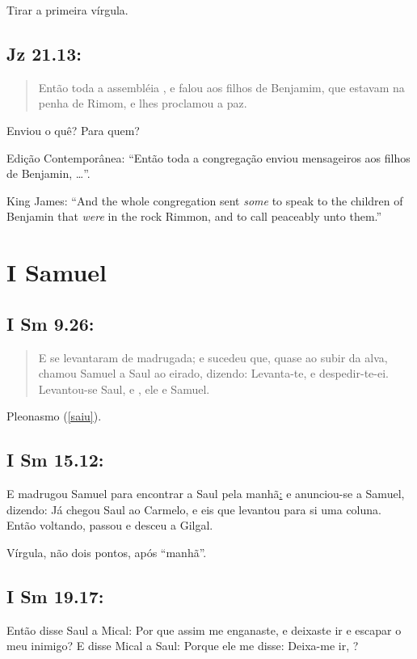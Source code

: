 Tirar a primeira vírgula.

\subsection{Jz 21.13:}
\begin{quote}
    \small
    Então toda a assembléia , e falou aos filhos de Benjamim, que estavam na penha de Rimom, e lhes proclamou a paz.
\end{quote}

Enviou o quê? Para quem?

Edição Contemporânea: ``Então toda a congregação enviou mensageiros aos filhos de Benjamin, \ldots''.

King James: ``And the whole congregation sent \emph{some} to speak to the
children of Benjamin that \emph{were} in the rock Rimmon, and to call
peaceably unto them.''

\section{I Samuel}
\subsection{I Sm 9.26:}
\begin{quote}
    \small
    E se levantaram de madrugada; e sucedeu que, quase ao subir da alva, chamou Samuel a Saul ao eirado, dizendo: Levanta-te, e despedir-te-ei. Levantou-se Saul, e , ele e Samuel.
\end{quote}

Pleonasmo (\ref{saiu}).

\subsection{I Sm 15.12:} E madrugou Samuel para encontrar a Saul pela manhã\uline{:} e anunciou-se a Samuel, dizendo: Já chegou Saul ao Carmelo, e eis que levantou para si uma coluna. Então voltando, passou e desceu a Gilgal.

Vírgula, não dois pontos, após ``manhã''.

\subsection{I Sm 19.17:} Então disse Saul a Mical: Por que assim me enganaste, e deixaste ir e escapar o meu inimigo? E disse Mical a Saul: Porque ele me disse: Deixa-me ir, ?

